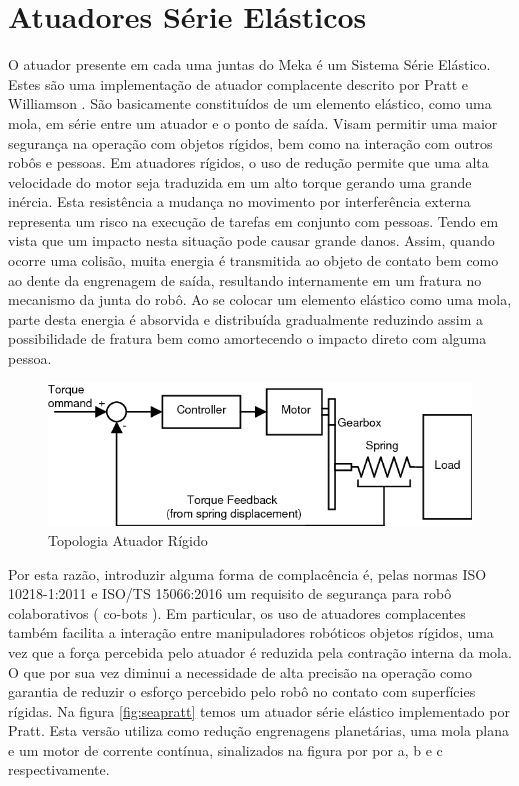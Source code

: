\section{Atuadores Série Elásticos \label{sec:sea}}

O atuador presente em cada uma juntas do Meka é um Sistema Série Elástico. Estes são uma implementação de atuador complacente descrito por Pratt e Williamson \cite{pratt1995series}. São basicamente constituídos de um elemento elástico, como uma mola, em série entre um atuador e o ponto de saída. Visam permitir uma maior segurança na operação com objetos rígidos, bem como na interação com outros robôs e pessoas. Em atuadores rígidos, o uso de redução permite que uma alta velocidade do motor seja traduzida em um alto torque gerando uma grande inércia. Esta resistência a mudança no movimento por interferência externa representa um risco na execução de tarefas em conjunto com pessoas. Tendo em vista que um impacto nesta situação pode causar grande danos. Assim, quando ocorre uma colisão, muita energia é transmitida ao objeto de contato bem como ao dente da engrenagem de saída, resultando internamente em um fratura no mecanismo da junta do robô. Ao se colocar um elemento elástico como uma mola, parte desta energia é absorvida e distribuída gradualmente reduzindo assim a possibilidade de fratura bem como amortecendo o impacto direto com alguma pessoa.

\begin{figure}[H]
    \centering
    \includegraphics[width=0.8\linewidth]{tex/figs/sea_topology.png}
    \caption{Topologia Atuador Rígido \cite{wyeth2016}}
    \label{fig:sea}
\end{figure}

Por esta razão, introduzir alguma forma de complacência é, pelas normas ISO 10218-1:2011 e ISO/TS 15066:2016 um requisito de segurança para robô colaborativos ( co-bots ). Em particular, os uso de atuadores complacentes também facilita a interação entre manipuladores robóticos objetos rígidos, uma vez que a força percebida pelo atuador é reduzida pela contração interna da mola. O que por sua vez diminui a necessidade de alta precisão na operação como garantia de reduzir o esforço percebido pelo robô no contato com superfícies rígidas. Na figura \ref{fig:seapratt} temos um atuador série elástico implementado por Pratt. Esta versão utiliza como redução engrenagens planetárias, uma mola plana e um motor de corrente contínua, sinalizados na figura por por a, b e c respectivamente.

